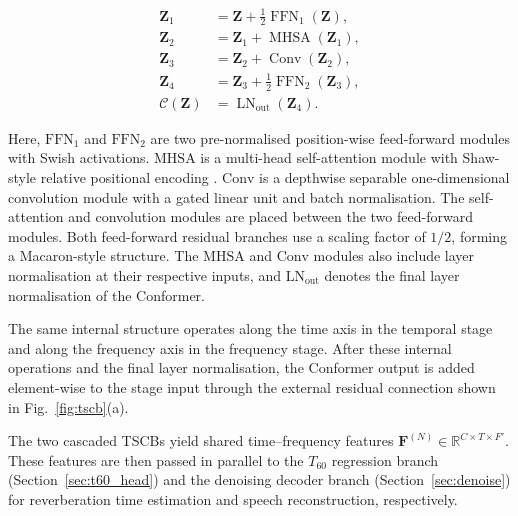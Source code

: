 \documentclass[a4paper,fleqn]{cas-sc}
\begin{document}


\begin{equation}
\begin{aligned}
\mathbf Z_1
&=\mathbf Z+\tfrac12\operatorname{FFN}_1(\mathbf Z),\\
\mathbf Z_2
&=\mathbf Z_1+\operatorname{MHSA}(\mathbf Z_1),\\
\mathbf Z_3
&=\mathbf Z_2+\operatorname{Conv}(\mathbf Z_2),\\
\mathbf Z_4
&=\mathbf Z_3+\tfrac12\operatorname{FFN}_2(\mathbf Z_3),\\
\mathcal C(\mathbf Z)
&=\operatorname{LN}_{\mathrm{out}}(\mathbf Z_4).
\end{aligned} \tag{8}\label{eq:conformer}
\end{equation}



\noindent Here, $\mathrm{FFN}_1$ and $\mathrm{FFN}_2$ are two pre-normalised position-wise feed-forward modules with Swish activations. $\mathrm{MHSA}$ is a multi-head self-attention module with Shaw-style relative positional encoding \citep{shaw2018relativepos}. $\mathrm{Conv}$ is a depthwise separable one-dimensional convolution module with a gated linear unit and batch normalisation. The self-attention and convolution modules are placed between the two feed-forward modules. Both feed-forward residual branches use a scaling factor of $1/2$, forming a Macaron-style structure. The $\mathrm{MHSA}$ and $\mathrm{Conv}$ modules also include layer normalisation at their respective inputs, and $\mathrm{LN}_{\mathrm{out}}$ denotes the final layer normalisation of the Conformer.



The same internal structure operates along the time axis in the temporal stage and along the frequency axis in the frequency stage. After these internal operations and the final layer normalisation, the Conformer output is added element-wise to the stage input through the external residual connection shown in Fig.~\ref{fig:tscb}(a).



The two cascaded TSCBs yield shared time--frequency features $\mathbf F^{(N)}\in\mathbb R^{C\times T\times F'}$. These features are then passed in parallel to the $T_{60}$ regression branch (Section~\ref{sec:t60_head}) and the denoising decoder branch (Section~\ref{sec:denoise}) for reverberation time estimation and speech reconstruction, respectively.
\end{document}
